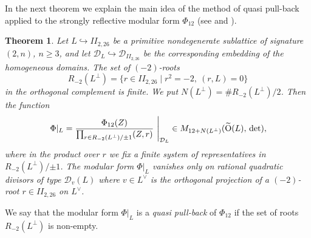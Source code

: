 \documentclass[a4paper,11pt]{article}
\newtheorem{theorem}[lemma]{Theorem}
\renewcommand{\cD}{\mathcal D}
\newcommand{\emb}{\hookrightarrow}
\renewcommand{\Tilde}{\widetilde}
\newcommand{\Orth}{\mathop{\null\mathrm {O}}\nolimits}
\begin{document}
In the next theorem we explain the main idea of the method of quasi
pull-back applied to the strongly reflective modular form $\Phi_{12}$
(see \cite[pp.~200--201]{B1} and \cite{BKPS}).

\begin{theorem}\label{thm:qpb}
Let $L\emb II_{2,26}$ be a primitive nondegenerate sublattice of
signature $(2,n)$, $n\ge 3$, and let $\cD_L\emb\cD_{II_{2,26}}$ be the
corresponding embedding of the homogeneous domains.  The set of
$(-2)$-roots
\begin{equation*}
R_{-2}(L^\perp)=\{r\in II_{2,26}\mid r^2=-2,\ (r, L)=0\}
\end{equation*}
in the orthogonal complement is finite.
We put $N(L^\perp)=\# R_{-2}(L^\perp)/2$. Then the function
\begin{equation}\label{qpb}
  \left. \Phi|_L=
    \frac{\Phi_{12}(Z)}{
      \prod_{r\in R_{-2}(L^\perp)/{\pm 1}} (Z, r)}
    \ \right\vert_{\cD_L}
  \in M_{12+N(L^\perp)}(\Tilde{\Orth}(L),\, \det),
\end{equation}
where in the product over $r$ we fix a finite system of
representatives in $R_{-2}(L^\perp)/{\pm 1}$.  The modular form
$\Phi|_L$ vanishes only on rational quadratic divisors of type
$\cD_v(L)$ where $v\in L^\vee$ is the orthogonal projection of a
$(-2)$-root $r\in II_{2,26}$ on $L^\vee$.
\end{theorem}
We say that the modular form $\Phi|_L$ is a \emph{quasi pull-back} of
$\Phi_{12}$ if the set of roots $R_{-2}(L^\perp)$ is non-empty.
\end{document}
